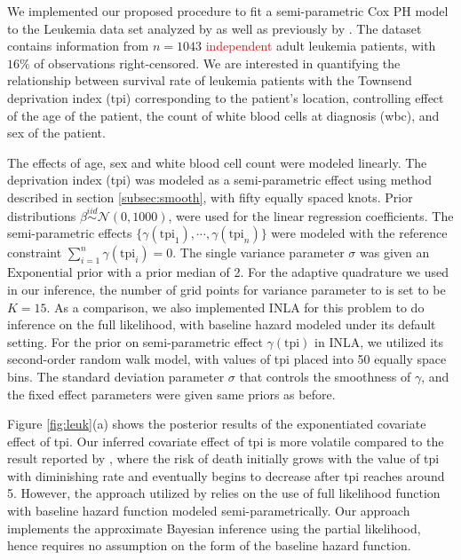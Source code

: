 \documentclass[ba]{imsart}
\newcommand{\highlight}[1]{\textcolor{red}{#1}}
\begin{document}
We implemented our proposed procedure to fit a semi-parametric Cox PH model to the Leukemia data set analyzed by \cite{inlacoxph} as well as previously by \cite{spde,leukaemia}. The dataset contains information from $n=1043$ \highlight{independent} adult leukemia patients, with $16\%$ of observations right-censored. We are interested in quantifying the relationship between survival rate of leukemia patients with the Townsend deprivation index (tpi) corresponding to the patient's location, controlling effect of the age of the patient, the count of white blood cells at diagnosis (wbc), and sex of the patient.

The effects of age, sex and white blood cell count were modeled linearly. The deprivation index (tpi) was modeled as a semi-parametric effect using method described in section \ref{subsec:smooth}, with fifty equally spaced knots. Prior distributions $\beta \stackrel{iid}{\sim} \mathcal{N}(0, 1000)$, were used for the linear regression coefficients. The semi-parametric effects $\{\gamma(\text{tpi}_1), \cdots, \gamma(\text{tpi}_n)\}$ were modeled with the reference constraint $\sum_{i=1}^{n}\gamma(\text{tpi}_i) = 0$. The single variance parameter $\sigma$ was given an $\text{Exponential}$ prior with a prior median of 2. For the adaptive quadrature we used in our inference, the number of grid points for variance parameter to is set to be $K = 15$. As a comparison, we also implemented INLA for this problem to do inference on the full likelihood, with baseline hazard modeled under its default setting. For the prior on semi-parametric effect $\gamma(\text{tpi})$ in INLA, we utilized its second-order random walk model, with values of tpi placed into 50 equally space bins. The standard deviation parameter $\sigma$ that controls the smoothness of $\gamma$, and the fixed effect parameters were given same priors as before.

Figure \ref{fig:leuk}(a) shows the posterior results of the exponentiated covariate effect of tpi. Our inferred covariate effect of tpi is more volatile compared to the result reported by \cite{inlacoxph}, where the risk of death initially grows with the value of tpi with diminishing rate and eventually begins to decrease after tpi reaches around 5. However, the approach utilized by \cite{inlacoxph} relies on the use of full likelihood function with baseline hazard function modeled semi-parametrically. Our approach implements the approximate Bayesian inference using the partial likelihood, hence requires no assumption on the form of the baseline hazard function. 
\end{document}
